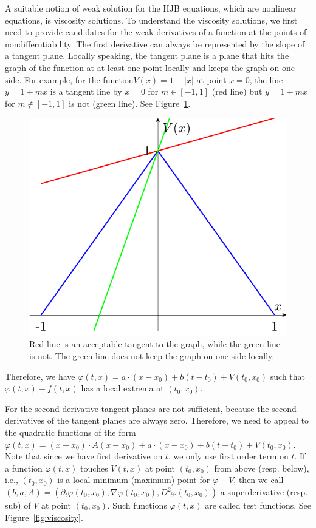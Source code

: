 \documentclass[11pt]{book}
\begin{document}
A suitable notion of weak solution for the HJB equations, which are nonlinear equations, is viscosity solutions. To understand the viscosity solutions, we first need to provide candidates for the weak derivatives of a function at the points of nondifferntiability. The first derivative can always be represented by the slope of a tangent plane.  Locally speaking, the tangent plane is a plane that hits the graph of the function at at least one point locally and keeps the graph on one side. For example, for the function$V(x)=1-|x|$ at point $x=0$, the line $y=1+mx$ is a tangent line by $x=0$ for $m\in[-1,1]$ (red line) but $y=1+mx$ for $m\notin[-1,1]$ is not (green line). See Figure~\ref{fig:tangent}. 
\begin{figure}[ht!]
\centering
\includegraphics{Figs/tangent}
\caption{Red line is an acceptable tangent to the graph, while the green line is not. The green line does not keep the graph on one side locally.}
\label{fig:tangent}
\end{figure}
Therefore, we have $\varphi(t,x)=a\cdot (x-x_0)+b (t-t_0)+V(t_0,x_0)$ such that $\varphi(t,x)-f(t,x)$ has a local extrema at $(t_0,x_0)$.

For the second derivative tangent planes are not sufficient, because the second derivatives of the tangent planes are always zero. Therefore, we need to appeal to the quadratic functions of the form $\varphi(t,x)=(x-x_0)\cdot  A(x-x_0)+ a\cdot (x-x_0)+b (t-t_0)+ V(t_0,x_0)$. Note that since we have first derivative on $t$, we only use first order term on $t$. If a function $\varphi(t,x)$ touches $V(t,x)$ at point $(t_0,x_0)$ from above (resp. below), i.e., $(t_0,x_0)$ is a local minimum (maximum) point for $\varphi-V$, then we call $(b,a,A)=(\partial_t\varphi(t_0,x_0),\nabla\varphi(t_0,x_0),D^2\varphi(t_0,x_0))$ a superderivative (resp. sub) of $V$ at point $(t_0,x_0)$. Such functions $\varphi(t,x)$ are called test functions. See Figure~\ref{fig:viscosity}.
\end{document}
